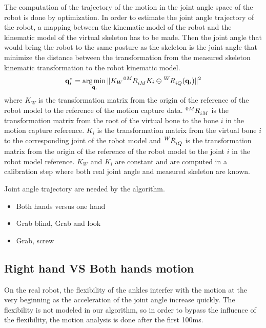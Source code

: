 \documentclass[letterpaper, 10pt, conference]{ieeeconf}      %
\begin{document}
The computation of the trajectory of the motion in the joint angle space
of the robot is done by optimization.
In order to estimate the joint angle trajectory of the robot, a mapping between
the kinematic model of the robot and the kinematic model of the virtual skeleton
has to be made. Then the joint angle that would bring the robot to the same posture
as the skeleton is the joint angle that minimize the distance between
the transformation from the measured skeleton kinematic transformation to the robot kinematic model.
\begin{equation}
\mbf{q}^*_i = \underset{\mbf{q}_i}\argmin \Vert K_W\tensor[^{0M}]{R}{_{iM}}K_i \ominus \tensor[^W]{R}{_{iQ}}(\mbf{q}_i) \Vert ^2\\
\label{mocapOpti}
\end{equation}
where $K_W$ is the transformation matrix from the origin of the reference of the robot model to the reference of the 
motion capture data. $\tensor[^{0M}]{R}{_{iM}}$ is the transformation matrix from the root of the virtual bone to
the bone $i$ in the motion capture reference. $K_i$ is the transformation matrix from the virtual bone $i$ to
the corresponding joint of the robot model and $\tensor[^W]{R}{_{iQ}}$ is the transformation matrix from 
the origin of the reference of the robot model to the joint $i$ in the robot model reference.
$K_W$ and $K_i$ are constant and are computed in a calibration step where both real joint angle and
measured skeleton are known.

Joint angle trajectory are needed by the algorithm.

\begin{itemize}
\item Both hands versus one hand
\item Grab blind, Grab and look
\item Grab, screw
\end{itemize}

\subsection{Right hand VS Both hands motion}
On the real robot, the flexibility of the ankles interfer with the motion at the very beginning as the acceleration
of the joint angle increase quickly. The flexibility is not modeled in our algorithm, so
in order to bypass the influence of the flexibility, the motion analysis is done after the first 100ms.
\end{document}
